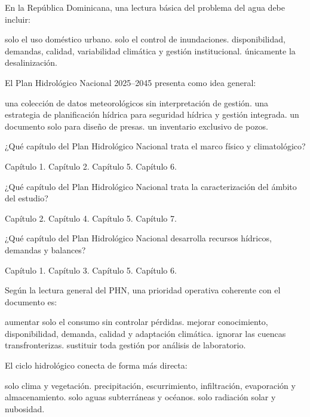 \begin{questions}
\question[3] En la República Dominicana, una lectura básica del problema
del agua debe incluir:
\begin{choices}
  \choice solo el uso doméstico urbano.
  \choice solo el control de inundaciones.
  \CorrectChoice disponibilidad, demandas, calidad, variabilidad climática y gestión institucional.
  \choice únicamente la desalinización.
\end{choices}

\question[3] El Plan Hidrológico Nacional 2025--2045 presenta como idea
general:
\begin{choices}
  \choice una colección de datos meteorológicos sin interpretación de gestión.
  \CorrectChoice una estrategia de planificación hídrica para seguridad hídrica y gestión integrada.
  \choice un documento solo para diseño de presas.
  \choice un inventario exclusivo de pozos.
\end{choices}

\question[2] ¿Qué capítulo del Plan Hidrológico Nacional trata el marco
físico y climatológico?
\begin{choices}
  \choice Capítulo 1.
  \CorrectChoice Capítulo 2.
  \choice Capítulo 5.
  \choice Capítulo 6.
\end{choices}

\question[2] ¿Qué capítulo del Plan Hidrológico Nacional trata la
caracterización del ámbito del estudio?
\begin{choices}
  \choice Capítulo 2.
  \choice Capítulo 4.
  \CorrectChoice Capítulo 5.
  \choice Capítulo 7.
\end{choices}

\question[2] ¿Qué capítulo del Plan Hidrológico Nacional desarrolla
recursos hídricos, demandas y balances?
\begin{choices}
  \choice Capítulo 1.
  \choice Capítulo 3.
  \choice Capítulo 5.
  \CorrectChoice Capítulo 6.
\end{choices}

\question[3] Según la lectura general del PHN, una prioridad operativa
coherente con el documento es:
\begin{choices}
  \choice aumentar solo el consumo sin controlar pérdidas.
  \CorrectChoice mejorar conocimiento, disponibilidad, demanda, calidad y adaptación climática.
  \choice ignorar las cuencas transfronterizas.
  \choice sustituir toda gestión por análisis de laboratorio.
\end{choices}

\question[3] El ciclo hidrológico conecta de forma más directa:
\begin{choices}
  \choice solo clima y vegetación.
  \CorrectChoice precipitación, escurrimiento, infiltración, evaporación y almacenamiento.
  \choice solo aguas subterráneas y océanos.
  \choice solo radiación solar y nubosidad.
\end{choices}


\end{questions}
